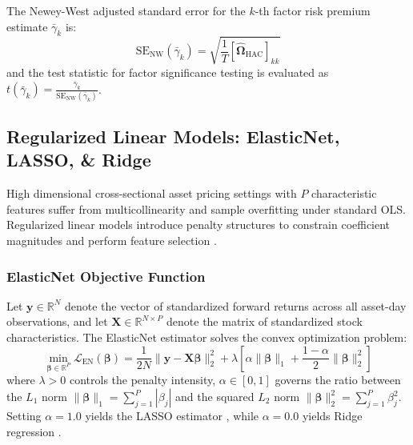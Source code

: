 The Newey-West adjusted standard error for the $k$-th factor risk premium estimate $\bar{\gamma}_k$ is:
\begin{equation}
\text{SE}_{\text{NW}}(\bar{\gamma}_k) = \sqrt{ \frac{1}{T} \left[ \widehat{\mathbf{\Omega}}_{\text{HAC}} \right]_{kk} }
\end{equation}
and the test statistic for factor significance testing is evaluated as $t(\bar{\gamma}_k) = \frac{\bar{\gamma}_k}{\text{SE}_{\text{NW}}(\bar{\gamma}_k)}$.

\subsection{Regularized Linear Models: ElasticNet, LASSO, \& Ridge}
\label{subsec:ch4_elasticnet_lasso_ridge}

High dimensional cross-sectional asset pricing settings with $P$ characteristic features suffer from multicollinearity and sample overfitting under standard OLS. Regularized linear models introduce penalty structures to constrain coefficient magnitudes and perform feature selection \citep{kozak2020shrinking}.

\subsubsection{ElasticNet Objective Function}
Let $\mathbf{y} \in \mathbb{R}^N$ denote the vector of standardized forward returns across all asset-day observations, and let $\mathbf{X} \in \mathbb{R}^{N \times P}$ denote the matrix of standardized stock characteristics. The ElasticNet estimator \citep{zou2005regularization} solves the convex optimization problem:
\begin{equation}
\min_{\boldsymbol{\beta} \in \mathbb{R}^P} \mathcal{L}_{\text{EN}}(\boldsymbol{\beta}) = \frac{1}{2N} \|\mathbf{y} - \mathbf{X}\boldsymbol{\beta}\|_2^2 + \lambda \left[ \alpha \|\boldsymbol{\beta}\|_1 + \frac{1-\alpha}{2} \|\boldsymbol{\beta}\|_2^2 \right]
\label{eq:ch4_elasticnet_full}
\end{equation}
where $\lambda > 0$ controls the penalty intensity, $\alpha \in [0, 1]$ governs the ratio between the $L_1$ norm $\|\boldsymbol{\beta}\|_1 = \sum_{j=1}^P |\beta_j|$ and the squared $L_2$ norm $\|\boldsymbol{\beta}\|_2^2 = \sum_{j=1}^P \beta_j^2$. Setting $\alpha = 1.0$ yields the LASSO estimator \citep{tibshirani1996regression}, while $\alpha = 0.0$ yields Ridge regression \citep{hoerl1970ridge}.

